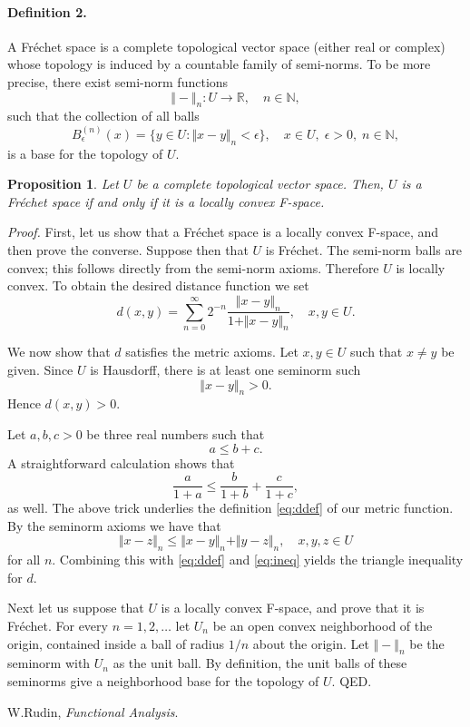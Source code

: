 \documentclass[12pt]{article}
\newcommand{\reals}{\mathbb{R}}
\newcommand{\natnums}{\mathbb{N}}
\newtheorem{proposition}{Proposition}
\begin{document}
\paragraph{Definition 2.}
A Fr\'echet space is a complete topological vector space (either real
or complex) whose topology is induced by a countable family of
semi-norms. To be more precise, there exist semi-norm functions
$$\Vert - \Vert_n : U \rightarrow \reals,\quad n\in\natnums,$$
such that the collection of all balls
$$B_{\epsilon}^{(n)}(x) = \{ y \in U : \Vert x-y\Vert_n < \epsilon\},\quad
x\in U,\; \epsilon>0,\; n\in\natnums,$$
is a base for the topology of $U$.


\begin{proposition}
Let $U$ be a complete topological vector space. Then, $U$ is a
Fr\'echet space if and only if it is a locally convex F-space.
\end{proposition}

\noindent\emph{Proof.}
First, let us show that a Fr\'echet space is a locally convex F-space,
and then prove the converse. Suppose then that $U$ is Fr\'echet. The
semi-norm balls are convex; this follows directly from the semi-norm
axioms. Therefore $U$ is locally convex. To obtain the desired
distance function we set
\begin{equation}
\label{eq:ddef}
d(x,y) = \sum_{n=0}^\infty 2^{-n} \frac{\Vert x-y \Vert_n}{1+\Vert
x-y\Vert_n},\quad x,y\in U.
\end{equation}

We now show that $d$ satisfies the metric axioms. Let $x,y \in U$
such that $x\neq y$ be given. Since $U$ is Hausdorff, there is at
least one seminorm such
$$\Vert x-y\Vert_n >0.$$
Hence $d(x,y)>0$.

Let $a,b,c>0$ be three real numbers such that
$$a\leq b+c.$$
A straightforward calculation shows
that
\begin{equation}
\label{eq:ineq}
\frac{a}{1+a}\leq \frac{b}{1+b}+\frac{c}{1+c},
\end{equation}
as well. The above trick underlies the definition \eqref{eq:ddef} of
our metric function. By the seminorm axioms we have that
$$\Vert x-z \Vert_n \leq \Vert x-y \Vert_n + \Vert y-z \Vert_n,\quad
x,y,z\in U$$
for all $n$. Combining this with \eqref{eq:ddef} and
\eqref{eq:ineq} yields the triangle inequality for $d$.


Next let us suppose that $U$ is a locally convex F-space, and prove
that it is Fr\'echet. For every $n=1,2,\ldots$ let $U_n$ be an open
convex neighborhood of the origin, contained inside a ball of radius
$1/n$ about the origin. Let $\Vert - \Vert_n$ be the seminorm with
$U_n$ as the unit ball. By definition, the unit balls of these
seminorms give a neighborhood base for the topology of $U$. QED.


\begin{thebibliography}{9}
W.Rudin, \emph{Functional Analysis}.
\end{thebibliography}
\end{document}
